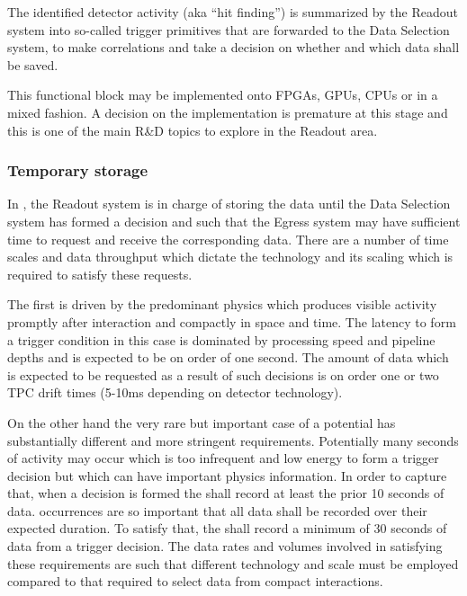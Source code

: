 The identified detector activity (aka ``hit finding'') is summarized by the Readout system into so-called trigger primitives that are forwarded to the Data Selection system, to make correlations and take a decision on whether and which data shall be saved.

This functional block may be implemented onto FPGAs, GPUs, CPUs or in a mixed fashion. A decision on the implementation is premature at this stage and this is one of the main R\&D topics to explore in the Readout area.

\subsubsection{Temporary storage}

In , the Readout system is in charge of storing the data until the Data Selection system has formed a decision and such that the Egress system may have sufficient time to request and receive the corresponding data.
There are a number of time scales and data throughput which dictate the technology and its scaling which is required to satisfy these requests.

The first is driven by the predominant physics which produces visible activity promptly after interaction and compactly in space and time. 
The latency to form a trigger condition in this case is dominated by processing speed and pipeline depths and is expected to be on order of one second.  The amount of data which is expected to be requested as a result of such decisions is on order one or two TPC drift times (5-10\si{\milli\second} depending on detector technology).

On the other hand the very rare but important case of a potential  has substantially different and more stringent requirements. 
Potentially many seconds of activity may occur which is too infrequent and low energy to form a trigger decision but which can have important physics information. 
In order to capture that, when a  decision is formed the  shall record at least the prior 10 seconds of data. 
 occurrences are so important that all data shall be recorded over their expected duration. 
To satisfy that, the  shall record a minimum of 30 seconds of data from a  trigger decision. 
The data rates and volumes involved in satisfying these requirements are such that different technology and scale must be employed compared to that required to select data from compact interactions.

